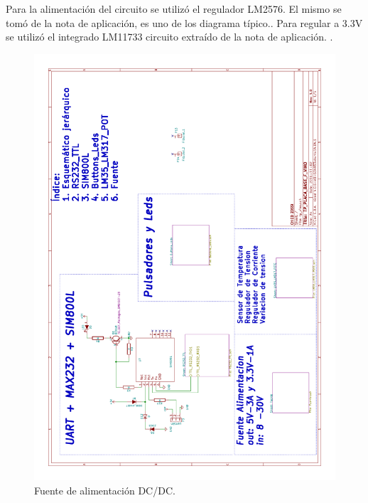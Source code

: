 Para la alimentación del circuito se utilizó el regulador LM2576. El mismo se tomó de la nota de aplicación, es uno de los diagrama típico.\citep{Texas:LM2576}.
Para regular a 3.3V se utilizó el integrado LM11733 circuito extraído de la nota de aplicación. \citep{Texas:LM11733}.
\begin{figure}[!htb]
  \centering
  \includegraphics[page=3,scale=0.3,angle=270]{./Figures/schematic.pdf}
  \caption{Fuente de alimentación DC/DC.}
  \label{fig:fuente}
\end{figure}

